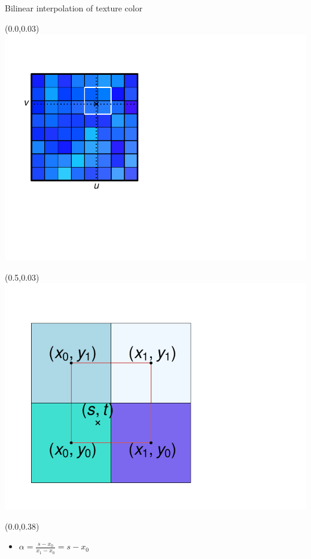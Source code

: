\documentclass[utf8,stillsansserifmath,fleqn,t]{beamer}
\begin{document}
\begin{frame}[label=texture-bilin]
\frametitle{\insertsection}
Bilinear interpolation of texture color
\begin{textblock}{.25}(0.0,0.03) \includegraphics[width=\textwidth]{./fig/texture-access-2d-3.pdf} \end{textblock}
\begin{textblock}{.35}(0.5,0.03) \includegraphics[width=\textwidth]{./fig/bilinear-interpolation-color.pdf} \end{textblock}
\begin{textblock}{.4}(0.0,0.38)
\begin{itemize}
\item $\displaystyle \alpha = \frac{s-x_0}{x_1-x_0}=s-x_0$

\end{itemize}
\end{textblock}
\end{frame}
\end{document}
